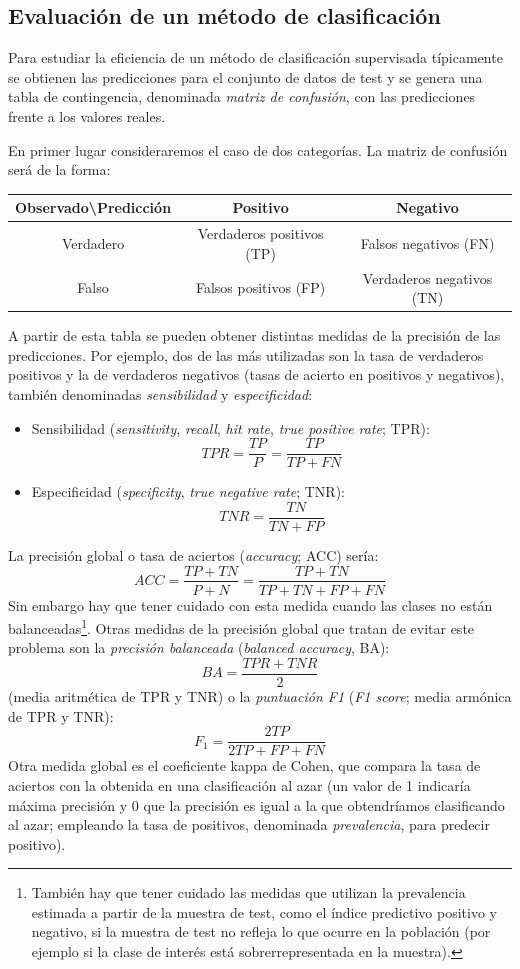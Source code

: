 \documentclass[]{book}
\theoremstyle{break}
\theoremstyle{definition}
\theoremstyle{definition}
\theoremstyle{definition}
\theoremstyle{remark}
\begin{document}
\subsection{Evaluación de un método de clasificación}\label{eval-class}

Para estudiar la eficiencia de un método de clasificación supervisada
típicamente se obtienen las predicciones para el conjunto de datos de
test y se genera una tabla de contingencia, denominada \emph{matriz de
confusión}, con las predicciones frente a los valores reales.

En primer lugar consideraremos el caso de dos categorías. La matriz de
confusión será de la forma:

\begin{longtable}[]{@{}ccc@{}}
\toprule
Observado\textbackslash{}Predicción & Positivo & Negativo\tabularnewline
\midrule
\endhead
Verdadero & Verdaderos positivos (TP) & Falsos negativos
(FN)\tabularnewline
Falso & Falsos positivos (FP) & Verdaderos negativos (TN)\tabularnewline
\bottomrule
\end{longtable}

A partir de esta tabla se pueden obtener distintas medidas de la
precisión de las predicciones. Por ejemplo, dos de las más utilizadas
son la tasa de verdaderos positivos y la de verdaderos negativos (tasas
de acierto en positivos y negativos), también denominadas
\emph{sensibilidad} y \emph{especificidad}:

\begin{itemize}
\item
  Sensibilidad (\emph{sensitivity}, \emph{recall}, \emph{hit rate},
  \emph{true positive rate}; TPR):
  \[TPR = \frac{TP}{P} = \frac{TP}{TP+FN}\]
\item
  Especificidad (\emph{specificity}, \emph{true negative rate}; TNR):
  \[TNR = \frac{TN}{TN+FP}\]
\end{itemize}

La precisión global o tasa de aciertos (\emph{accuracy}; ACC) sería:
\[ACC = \frac{TP + TN}{P + N} = \frac{TP+TN}{TP+TN+FP+FN}\] Sin embargo
hay que tener cuidado con esta medida cuando las clases no están
balanceadas\footnote{También hay que tener cuidado las medidas que
  utilizan la prevalencia estimada a partir de la muestra de test, como
  el índice predictivo positivo y negativo, si la muestra de test no
  refleja lo que ocurre en la población (por ejemplo si la clase de
  interés está sobrerrepresentada en la muestra).}. Otras medidas de la
precisión global que tratan de evitar este problema son la
\emph{precisión balanceada} (\emph{balanced accuracy}, BA):
\[BA = \frac{TPR + TNR}{2}\] (media aritmética de TPR y TNR) o la
\emph{puntuación F1} (\emph{F1 score}; media armónica de TPR y TNR):
\[F_1 = \frac{2TP}{2TP+FP+FN}\] Otra medida global es el coeficiente
kappa de Cohen, que compara la tasa de aciertos con la obtenida en una
clasificación al azar (un valor de 1 indicaría máxima precisión y 0 que
la precisión es igual a la que obtendríamos clasificando al azar;
empleando la tasa de positivos, denominada \emph{prevalencia}, para
predecir positivo).
\end{document}
